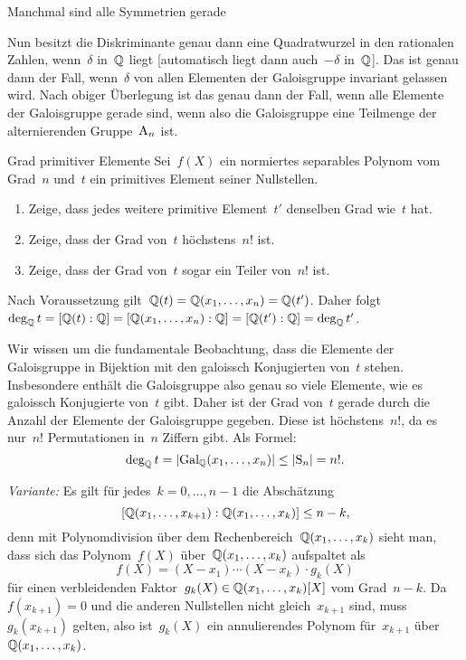 \documentclass{algblatt}
\begin{document}
\begin{aufgabe}{Manchmal sind alle Symmetrien gerade}
\begin{loesungE}
Nun besitzt die Diskriminante genau dann eine Quadratwurzel in den rationalen
Zahlen, wenn~$\delta$ in~$\mathbb{Q}$ liegt [automatisch liegt dann auch~$-\delta$
in~$\mathbb{Q}$]. Das ist genau dann der Fall, wenn~$\delta$ von allen Elementen der
Galoisgruppe invariant gelassen wird. Nach obiger Überlegung ist das genau dann
der Fall, wenn alle Elemente der Galoisgruppe gerade sind, wenn also die
Galoisgruppe eine Teilmenge der alternierenden Gruppe~$\mathrm{A}_n$ ist.
\end{loesungE}
\end{aufgabe}

\begin{aufgabe}{Grad primitiver Elemente}
Sei~$f(X)$ ein normiertes separables Polynom vom Grad~$n$ und~$t$ ein
primitives Element seiner Nullstellen.
\begin{enumerate}
\item Zeige, dass jedes weitere primitive Element~$t'$ denselben Grad wie~$t$
hat.
\item Zeige, dass der Grad von~$t$ höchstens~$n!$ ist.
\item Zeige, dass der Grad von~$t$ sogar ein Teiler von~$n!$ ist.
\end{enumerate}

\begin{loesungE}
\item Nach Voraussetzung gilt~$\mathbb{Q}(t) = \mathbb{Q}(x_1,\ldots,x_n) = \mathbb{Q}(t')$. Daher
folgt $\deg_{\mathbb{Q}} t = [\mathbb{Q}(t):\mathbb{Q}] = [\mathbb{Q}(x_1,\ldots,x_n):\mathbb{Q}] =
[\mathbb{Q}(t'):\mathbb{Q}] = \deg_{\mathbb{Q}} t'$.

\item Wir wissen um die fundamentale Beobachtung, dass die Elemente der
Galoisgruppe in Bijektion mit den galoissch Konjugierten von~$t$ stehen.
Insbesondere enthält die Galoisgruppe also genau so viele Elemente, wie es
galoissch Konjugierte von~$t$ gibt. Daher ist der Grad von~$t$ gerade durch
die Anzahl der Elemente der Galoisgruppe gegeben. Diese ist höchstens~$n!$, da
es nur~$n!$ Permutationen in~$n$ Ziffern gibt. Als Formel:
\[ \deg_{\mathbb{Q}} t = |\mathrm{Gal}_{\mathbb{Q}}(x_1,\ldots,x_n)| \leq |\mathrm{S}_n| = n!. \]

\emph{Variante:} Es gilt für jedes~$k = 0,\ldots,n-1$ die Abschätzung
\[ [\mathbb{Q}(x_1,\ldots,x_{k+1}):\mathbb{Q}(x_1,\ldots,x_k)] \leq n - k, \]
denn mit Polynomdivision über dem Rechenbereich~$\mathbb{Q}(x_1,\ldots,x_k)$ sieht
man, dass sich das Polynom~$f(X)$ über~$\mathbb{Q}(x_1,\ldots,x_k)$ aufspaltet als
\[ f(X) = (X-x_1) \cdots (X-x_k) \cdot g_k(X) \]
für einen verbleidenden Faktor~$g_k(X) \in \mathbb{Q}(x_1,\ldots,x_k)[X]$ vom
Grad~$n-k$. Da~$f(x_{k+1}) = 0$ und die anderen Nullstellen nicht gleich~$x_{k+1}$ sind,
muss~$g_k(x_{k+1})$ gelten, also ist~$g_k(X)$ ein annulierendes Polynom
für~$x_{k+1}$ über~$\mathbb{Q}(x_1,\ldots,x_k)$.


\end{loesungE}
\end{aufgabe}
\end{document}
